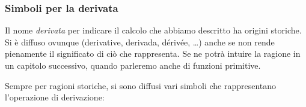 % 

\subsubsection{Simboli per la derivata}
Il nome \emph{derivata} per indicare il calcolo che abbiamo descritto ha 
origini storiche. Si è diffuso  ovunque (derivative, derivada, dérivée, 
\dots) anche se non rende pienamente il significato di ciò che rappresenta. 
Se ne potrà intuire la ragione in un capitolo successivo, quando parleremo 
anche di funzioni primitive.

Sempre per ragioni storiche, si sono diffusi vari simboli che rappresentano 
l'operazione di derivazione:

